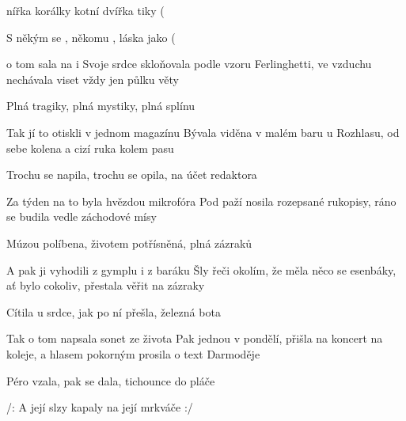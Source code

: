 
  \zs
     nířka  korálky  kotní   
      dvířka  tiky   (

    S někým se , někomu ,
    láska jako  (

     o tom sala  na i     
  \ks
  \zs
    Svoje srdce skloňovala podle vzoru Ferlinghetti,
    ve vzduchu nechávala viset vždy jen půlku věty

    Plná tragiky, plná mystiky,
    plná splínu

    Tak jí to otiskli v jednom magazínu
  \ks
  \zs
    Bývala viděna v malém baru u Rozhlasu,
    od sebe kolena a cizí ruka kolem pasu

    Trochu se napila, trochu se opila,
    na účet redaktora

    Za týden na to byla hvězdou mikrofóra
  \ks
  \zs
    Pod paží nosila rozepsané rukopisy,
    ráno se budila vedle záchodové mísy

    Múzou políbena, životem potřísněná,
    plná zázraků

    A pak ji vyhodili z gymplu i z baráku
  \ks
  \zs
    Šly řeči okolím, že měla něco se esenbáky,
    ať bylo cokoliv, přestala věřit na zázraky

    Cítila u srdce, jak po ní přešla,
    železná bota

    Tak o tom napsala sonet ze života
  \ks
  \zs
    Pak jednou v pondělí, přišla na koncert na koleje,
    a hlasem pokorným prosila o text Darmoděje

    Péro vzala, pak se dala,
    tichounce do pláče

    /: A její slzy kapaly na její mrkváče :/
  \ks
\kp

